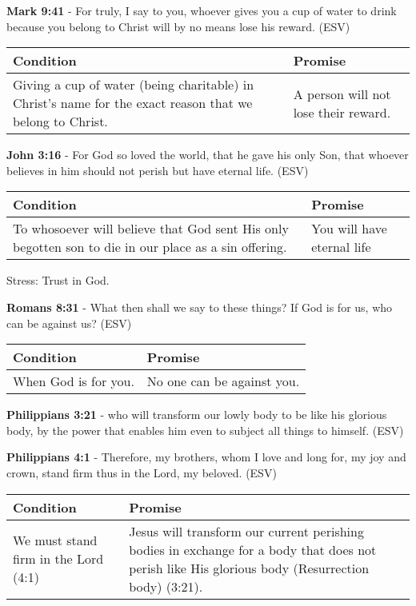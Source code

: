 \documentclass[11pt]{article}
\begin{document}
\textbf{Mark 9:41} -  For truly, I say to you, whoever gives you a cup of water to drink because you belong to Christ will by no means lose his reward.  (ESV)

\begin{center}
\begin{tabular}{ll}
Condition & Promise\\[0pt]
\hline
Giving a cup of water (being charitable) in Christ's name for the exact reason that we belong to Christ. & A person will not lose their reward.\\[0pt]
\end{tabular}
\end{center}

\textbf{John 3:16} -  For God so loved the world, that he gave his only Son, that whoever believes in him should not perish but have eternal life.  (ESV)

\begin{center}
\begin{tabular}{ll}
Condition & Promise\\[0pt]
\hline
To whosoever will believe that God sent His only begotten son to die in our place as a sin offering. & You will have eternal life\\[0pt]
\end{tabular}
\end{center}

Stress: Trust in God.

\textbf{Romans 8:31} -  What then shall we say to these things?  If God is for us, who can be against us?  (ESV)

\begin{center}
\begin{tabular}{ll}
Condition & Promise\\[0pt]
\hline
When God is for you. & No one can be against you.\\[0pt]
\end{tabular}
\end{center}

\textbf{Philippians 3:21} -  who will transform our lowly body to be like his glorious body, by the power that enables him even to subject all things to himself.  (ESV)

\textbf{Philippians 4:1} -  Therefore, my brothers, whom I love and long for, my joy and crown, stand firm thus in the Lord, my beloved.  (ESV)

\begin{center}
\begin{tabular}{ll}
Condition & Promise\\[0pt]
\hline
We must stand firm in the Lord (4:1) & Jesus will transform our current perishing bodies in exchange for a body that does not perish like His glorious body (Resurrection body) (3:21).\\[0pt]
\end{tabular}
\end{center}
\end{document}
